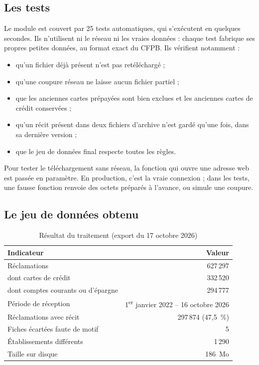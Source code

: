 \documentclass[11pt,a4paper]{article}
\begin{document}
\subsection{Les tests}

Le module est couvert par 25 tests automatiques, qui s'exécutent en quelques secondes. Ils n'utilisent ni le réseau ni les vraies données : chaque test fabrique ses propres petites données, au format exact du CFPB. Ils vérifient notamment :
\begin{itemize}
  \item qu'un fichier déjà présent n'est pas retéléchargé ;
  \item qu'une coupure réseau ne laisse aucun fichier partiel ;
  \item que les anciennes cartes prépayées sont bien exclues et les anciennes cartes de crédit conservées ;
  \item qu'un récit présent dans deux fichiers d'archive n'est gardé qu'une fois, dans sa dernière version ;
  \item que le jeu de données final respecte toutes les règles.
\end{itemize}

Pour tester le téléchargement sans réseau, la fonction qui ouvre une adresse web est passée en paramètre. En production, c'est la vraie connexion ; dans les tests, une fausse fonction renvoie des octets préparés à l'avance, ou simule une coupure.

\subsection{Le jeu de données obtenu}

\begin{table}[H]
\centering\small
\begin{tabular}{@{}l r@{}}
\toprule
Indicateur & Valeur \\
\midrule
Réclamations & 627\,297 \\
\quad dont cartes de crédit & 332\,520 \\
\quad dont comptes courants ou d'épargne & 294\,777 \\
Période de réception & 1\textsuperscript{er} janvier 2022 -- 16 octobre 2026 \\
Réclamations avec récit & 297\,874 (47,5~\%) \\
Fiches écartées faute de motif & 5 \\
Établissements différents & 1\,290 \\
Taille sur disque & 186~Mo \\
\bottomrule
\end{tabular}
\caption{Résultat du traitement (export du 17 octobre 2026)}
\end{table}
\end{document}
